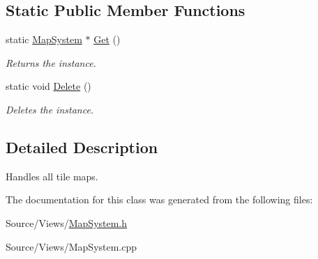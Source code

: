 \subsection*{Static Public Member Functions}
\begin{DoxyCompactItemize}
\item 
\mbox{\label{class_map_system_a1c471d051f4d40541f21a7882da835c2}} 
static \mbox{\hyperlink{class_map_system}{Map\+System}} $\ast$ \mbox{\hyperlink{class_map_system_a1c471d051f4d40541f21a7882da835c2}{Get}} ()
\begin{DoxyCompactList}\small\item\em Returns the instance. \end{DoxyCompactList}\item 
\mbox{\label{class_map_system_aba3e8e618abf21c5b62a94b8adfa33b9}} 
static void \mbox{\hyperlink{class_map_system_aba3e8e618abf21c5b62a94b8adfa33b9}{Delete}} ()
\begin{DoxyCompactList}\small\item\em Deletes the instance. \end{DoxyCompactList}\end{DoxyCompactItemize}


\subsection{Detailed Description}
Handles all tile maps. 

The documentation for this class was generated from the following files\+:\begin{DoxyCompactItemize}
\item 
Source/\+Views/\mbox{\hyperlink{_map_system_8h}{Map\+System.\+h}}\item 
Source/\+Views/Map\+System.\+cpp\end{DoxyCompactItemize}
